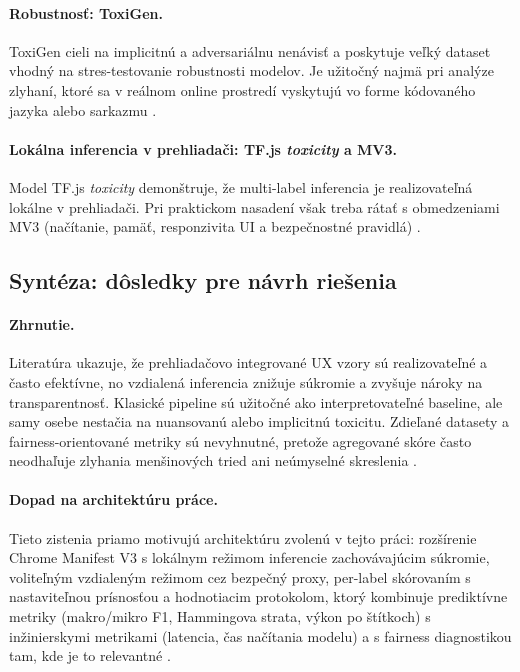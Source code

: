 \paragraph{Robustnosť: ToxiGen.}
ToxiGen cieli na implicitnú a adversariálnu nenávisť a poskytuje veľký dataset vhodný na stres-testovanie robustnosti modelov. Je užitočný najmä pri analýze zlyhaní, ktoré sa v reálnom online prostredí vyskytujú vo forme kódovaného jazyka alebo sarkazmu \cite{toxigen2022}\cite{hatecheck2021}.

\paragraph{Lokálna inferencia v prehliadači: TF.js \textit{toxicity} a MV3.}
Model TF.js \textit{toxicity} demonštruje, že multi-label inferencia je realizovateľná lokálne v prehliadači. Pri praktickom nasadení však treba rátať s obmedzeniami MV3 (načítanie, pamäť, responzivita UI a bezpečnostné pravidlá) \cite{tfjsToxicity}\cite{chromemv3}.

\subsection{Syntéza: dôsledky pre návrh riešenia}\label{subsec:synthesis_related}

\paragraph{Zhrnutie.}
Literatúra ukazuje, že prehliadačovo integrované UX vzory sú realizovateľné a často efektívne, no vzdialená inferencia znižuje súkromie a zvyšuje nároky na transparentnosť. Klasické pipeline sú užitočné ako interpretovateľné baseline, ale samy osebe nestačia na nuansovanú alebo implicitnú toxicitu. Zdieľané datasety a fairness-orientované metriky sú nevyhnutné, pretože agregované skóre často neodhaľuje zlyhania menšinových tried ani neúmyselné skreslenia \cite{jigsaw2019bias}\cite{borkan2019nuanced}\cite{dixon2018bias}\cite{sap2019racialbias}.

\paragraph{Dopad na architektúru práce.}
Tieto zistenia priamo motivujú architektúru zvolenú v tejto práci: rozšírenie Chrome Manifest V3 s lokálnym režimom inferencie zachovávajúcim súkromie, voliteľným vzdialeným režimom cez bezpečný proxy, per-label skórovaním s nastaviteľnou prísnosťou a hodnotiacim protokolom, ktorý kombinuje prediktívne metriky (makro/mikro F1, Hammingova strata, výkon po štítkoch) s inžinierskymi metrikami (latencia, čas načítania modelu) a s fairness diagnostikou tam, kde je to relevantné \cite{jigsaw2019bias}\cite{tfjsToxicity}\cite{chromemv3}\cite{borkan2019nuanced}.

